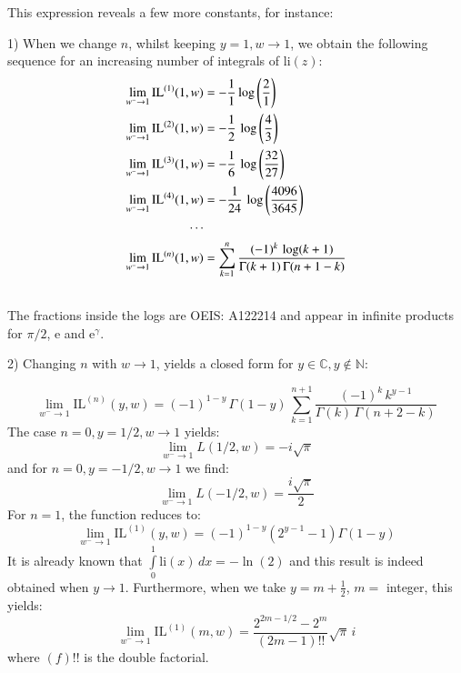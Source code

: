 \documentclass[a4paper,11pt,twoside]{amsart}
\newcommand\e{\mathrm{e}}
\newcommand\IL{\mathrm{IL}}
\newcommand\li{\mathrm{li}}
\begin{document}
This expression reveals a few more constants, for instance:

1) When we change $n$, whilst keeping $y=1, w \rightarrow 1$, we obtain the following sequence for an increasing number of integrals of $\li(z)$:
\begin{align}
\lim_{w^{-} \to 1} \IL^{(1)}(1,w) &= -\frac{1}{1}\log\left(\frac{2}{1}\right) \notag\\
\lim_{w^{-} \to 1} \IL^{(2)}(1,w) &= -\frac{1}{2}\,\log\left(\frac{4}{3}\right) \notag\\
\lim_{w^{-} \to 1} \IL^{(3)}(1,w) &= -\frac{1}{6}\,\log\left(\frac{32}{27}\right) \notag\\
\lim_{w^{-} \to 1} \IL^{(4)}(1,w) &= -\frac{1}{24}\,\log\left(\frac{4096}{3645}\right) \notag\\
\cdots \notag\\ 
\lim_{w^{-} \to 1} \IL^{(n)}(1,w) &= \sum_{k=1}^n \frac{(-1)^k\,\log(k+1)}{\Gamma(k+1)\,\Gamma(n+1-k)} \\ 
\notag
\end{align} 
The fractions inside the logs are OEIS: A122214 \cite{oeis2} and appear in infinite products for $\pi/2$, $\e$ and $\e^\gamma$.

2) Changing $n$ with $w \rightarrow 1$, yields a closed form for $y \in \mathbb{C}, y \notin \mathbb{N}$:

\begin{equation}\label{rootscomp5}
\lim_{w^{-} \to 1} \IL^{(n)}(y,w) = (-1)^{1-y}\,\Gamma(1-y)\,\sum_{k=1}^{n+1} \frac{(-1)^k\,k^{y-1}}{\Gamma(k)\,\Gamma(n+2-k)} 
\end{equation}
The case $n=0, y=1/2, w \rightarrow 1$ yields:
\begin{equation}\label{rootscomp6}
\lim_{w^{-} \to 1} L(1/2,w) = -i\sqrt{\pi}
\end{equation}
and for $n=0, y=-1/2, w \rightarrow 1$ we find:
\begin{equation}\label{rootscomp7}
\lim_{w^{-} \to 1} L(-1/2,w) = \frac{i\sqrt{\pi}}{2}
\end{equation}
For $n=1$, the function reduces to:
\begin{equation}\label{rootscomp8}
 \lim_{w^{-} \to 1} \IL^{(1)}(y,w) = (-1)^{1-y} \left(2^{y-1}-1\right)\Gamma(1-y)
 \end{equation} 
It is already known that $\int\limits_{0}^{1} \li(x)\, dx = -\ln(2)$ and this result is indeed obtained when $y \rightarrow 1$. Furthermore, when we take $y = m+\frac12$, $m = $ integer, this yields: 
\begin{equation}\label{rootscomp9}
\lim_{w^{-} \to 1} \IL^{(1)}(m,w) = \frac{2^{2m-1/2} - 2^m}{(2m - 1)!!} \sqrt{\pi}\, i 
\end{equation}
where $(f)!!$ is the double factorial.
\end{document}
